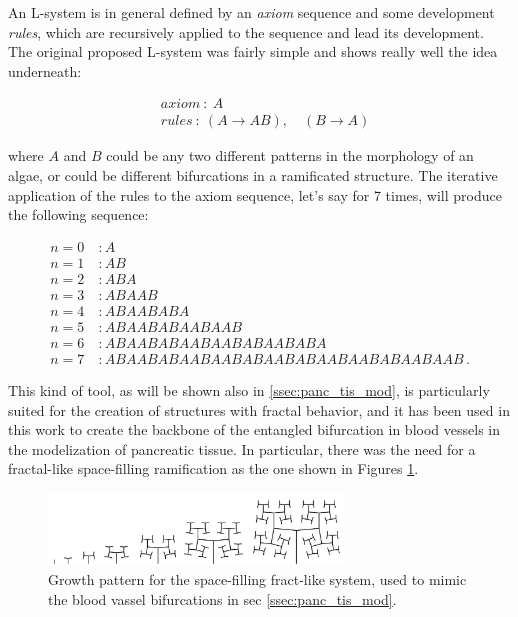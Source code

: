 \documentclass[12pt,a4paper]{report}
\begin{document}
    An L-system is in general defined by an \textit{axiom} sequence and some development \textit{rules}, which are recursively applied to the sequence and lead its development. The original proposed L-system was fairly simple and shows really well the idea underneath:

    \begin{align}
        & axiom\ :\ A \nonumber \\
        & rules\ :\ (A \rightarrow AB),\quad(B \rightarrow A) \nonumber
    \end{align}

    where $A$ and $B$ could be any two different patterns in the morphology of an algae, or could be different bifurcations in a ramificated structure. The iterative application of the rules to the axiom sequence, let's say for 7 times, will produce the following sequence:

    \begin{align}
        n = 0 &\ : A \nonumber \\
        n = 1 &\ : AB \nonumber \\
        n = 2 &\ : ABA \nonumber \\
        n = 3 &\ : ABAAB \nonumber \\
        n = 4 &\ : ABAABABA \nonumber \\
        n = 5 &\ : ABAABABAABAAB \nonumber \\
        n = 6 &\ : ABAABABAABAABABAABABA \nonumber \\
        n = 7 &\ : ABAABABAABAABABAABABAABAABABAABAAB\,. \nonumber
    \end{align}

    This kind of tool, as will be shown also in \ref{ssec:panc_tis_mod}, is particularly suited for the creation of structures with fractal behavior, and it has been used in this work to create the backbone of the entangled bifurcation in blood vessels in the modelization of pancreatic tissue. In particular, there was the need for a fractal-like space-filling ramification as the one shown in Figures \ref{fig:bf_ls}.

    \begin{figure}
        \centering
        \includegraphics[width = 0.7\textwidth]{images/bf_ls}
        \caption{Growth pattern for the space-filling fract-like system, used to mimic the blood vassel bifurcations in sec \ref{ssec:panc_tis_mod}.}
        \label{fig:bf_ls}
    \end{figure}
\end{document}
